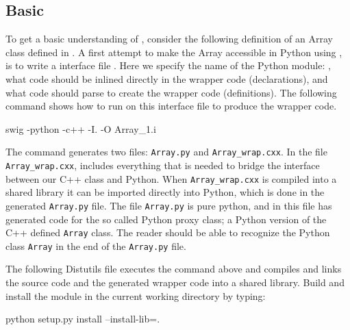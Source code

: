 \subsection{Basic \swig}
To get a basic understanding of \swig, consider the following definition of an Array class defined in .
A first attempt to make the Array accessible in Python using \swig, is to write a \swig interface file .
Here we specify the name of the Python module: , what code should be inlined directly in the wrapper code (declarations),  and what code \swig should parse to create the wrapper code  (definitions). The following command shows how to run \swig on this interface file to produce the wrapper code.
\begin{code}
swig -python -c++ -I. -O Array_1.i
\end{code}
The command generates two files: \texttt{Array.py} and \texttt{Array\_}\texttt{wrap.cxx}. In the file \texttt{Array\_}\texttt{wrap.cxx}, \swig includes everything that is needed to bridge the interface between our C++ class and Python. When \texttt{Array\_wrap.cxx} is compiled into a shared library it can be imported directly into Python, which is done in the generated \texttt{Array.py} file. The file \texttt{Array.py} is  pure python, and in this file \swig has generated code for the so called Python proxy class; a Python version of the C++ defined \texttt{Array} class. The reader should be able to recognize the Python class \texttt{Array} in the end of the \texttt{Array.py} file. \par

The following Distutils file executes the \swig command above and compiles and links the source code and the generated wrapper code into a shared library.
Build and install the module in the current working directory by typing:
\begin{code}
python setup.py install --install-lib=.
\end{code}


